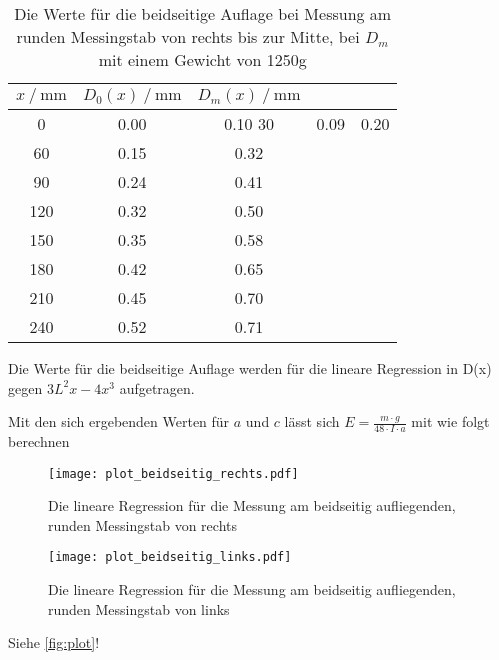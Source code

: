 \begin{table}[H]
  \centering
  \caption{Die Werte für die beidseitige Auflage bei Messung am runden Messingstab von rechts bis zur Mitte, bei $D_m$ mit 
  einem Gewicht von 1250g}
  \begin{tabular}{ccccc}
    \toprule
    {$x \mathbin{/} \unit{\milli\metre}$} &
    {$D_0(x) \mathbin{/} \unit{\milli\metre}$} &
    {$D_m(x) \mathbin{/} \unit{\milli\metre}$} \\
    \midrule
    0 & 0.00 & 0.10
    30 & 0.09 & 0.20  \\  
    60 & 0.15 & 0.32 \\
    90 & 0.24 & 0.41 \\
    120 & 0.32 & 0.50 \\
    150 & 0.35 & 0.58 \\
    180 & 0.42 & 0.65 \\
    210 & 0.45 & 0.70 \\
    240 & 0.52 & 0.71 \\
    \bottomrule
  \end{tabular}
  \label{tab:Tabelle3}
\end{table}


Die Werte für die beidseitige Auflage werden für die lineare Regression in D(x) gegen $3L^2 x - 4x^3$ aufgetragen.

Mit den sich ergebenden Werten für $a$ und $c$ lässt sich $E = \frac{m \cdot g}{48 \cdot I \cdot a}$ mit wie folgt berechnen



\begin{figure}
  \centering
  \texttt{[image: plot\_beidseitig\_rechts.pdf]}
  \caption{Die lineare Regression für die Messung am beidseitig aufliegenden, runden Messingstab von rechts}
  \label{fig:plot_beidseitig_rechts}
\end{figure} 

\begin{figure}
  \centering
  \texttt{[image: plot\_beidseitig\_links.pdf]}
  \caption{Die lineare Regression für die Messung am beidseitig aufliegenden, runden Messingstab von links}
  \label{fig:plot_beidseitig_links}
\end{figure}       %


Siehe \autoref{fig:plot}! 
